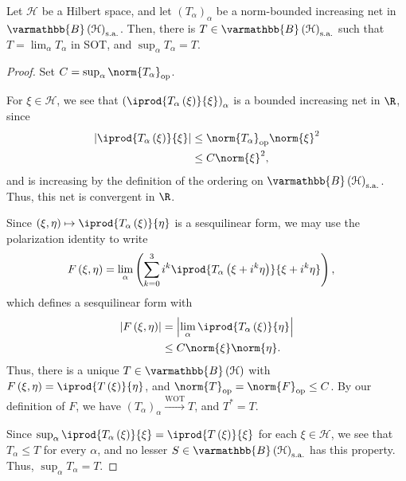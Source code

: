 \documentclass[10pt]{mypackage}
\renewcommand*{\mathbb}[1]{\varmathbb{#1}}
\newcommand{\sa}{\text{s.a.}}
\newcommand{\B}{\mathbb{B}}
\begin{document}
\begin{proposition}
  Let $\mathcal{H}$ be a Hilbert space, and let $\left(T_{\alpha}\right)_{\alpha}$ be a norm-bounded increasing net in $\B\left(\mathcal{H}\right)_{\sa}$. Then, there is $T\in \B\left(\mathcal{H}\right)_{\sa}$ such that $T = \lim_{\alpha}T_{\alpha}$ in SOT, and $\sup_{\alpha}T_{\alpha} = T$.
\end{proposition}
\begin{proof}
  Set $C = \sup_{\alpha}\norm{T_{\alpha}}_{\text{op}}$.\newline

  For $\xi\in \mathcal{H}$, we see that $ \left( \iprod{T_{\alpha}\left(\xi\right)}{\xi}\right)_{\alpha}$ is a bounded increasing net in $\R$, since
  \begin{align*}
    \left\vert \iprod{T_{\alpha}\left(\xi\right)}{\xi} \right\vert &\leq \norm{T_{\alpha}}_{\text{op}}\norm{\xi}^2\\
                                                                   &\leq C\norm{\xi}^2,
  \end{align*}
  and is increasing by the definition of the ordering on $\B\left(\mathcal{H}\right)_{\sa}$. Thus, this net is convergent in $\R$. \newline

  Since $\left(\xi,\eta\right)\mapsto \iprod{T_{\alpha}\left(\xi\right)}{\eta}$ is a sesquilinear form, we may use the polarization identity to write
  \begin{align*}
    F\left(\xi,\eta\right) &= \lim_{\alpha} \left( \sum_{k=0}^{3}i^{k} \iprod{T_{\alpha}\left(\xi + i^k\eta\right)}{\xi + i^{k}\eta}\right),
  \end{align*}
  which defines a sesquilinear form with
  \begin{align*}
    \left\vert F\left(\xi,\eta\right) \right\vert &= \left\vert \lim_{\alpha} \iprod{T_{\alpha}\left(\xi\right)}{\eta} \right\vert\\
                                                  &\leq C\norm{\xi}\norm{\eta}.
  \end{align*}
  Thus, there is a unique $T\in \B\left(\mathcal{H}\right)$ with $F\left(\xi,\eta\right) = \iprod{T\left(\xi\right)}{\eta}$, and $\norm{T}_{\text{op}} = \norm{F}_{\text{op}} \leq C$. By our definition of $F$, we have $\left(T_{\alpha}\right)_{\alpha}\xrightarrow{\text{WOT}} T$, and $T^{\ast} = T$.\newline

  Since $\sup_{\alpha} \iprod{T_{\alpha}\left(\xi\right)}{\xi} = \iprod{T\left(\xi\right)}{\xi}$ for each $\xi\in \mathcal{H}$, we see that $T_{\alpha}\leq T$ for every $\alpha$, and no lesser $S\in \B\left(\mathcal{H}\right)_{\sa}$ has this property. Thus, $\sup_{\alpha}T_{\alpha} = T$.\newline


\end{proof}
\end{document}
